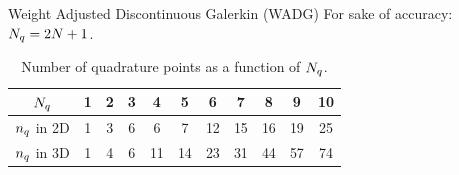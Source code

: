 \begin{frame}{Weight Adjusted Discontinuous Galerkin (WADG)}
  \scriptsize
  For sake of accuracy: ${N_q}=2{N}+1$.

  \begin{table}[!htbp]
\centering
\begin{tabular}{|c|c|c|c|c|c|c|c|c|c|c|}
\hline
${N_q}$    & 1 & 2 & 3 & 4  & 5  & 6  & 7  & 8  & 9  & 10 \\ \hline
${n_q}$ in 2D  & 1 & 3 & 6 & 6  & 7  & 12 & 15 & 16 & 19 & 25 \\ \hline
${n_q}$ in 3D  & 1 & 4 & 6 & 11 & 14 & 23 & 31 & 44 & 57 & 74 \\ \hline
\end{tabular}
\caption{\scriptsize{Number of quadrature points as a function of ${N_q}$.}}
\label{quadrature_point}
\end{table}



\end{frame}
